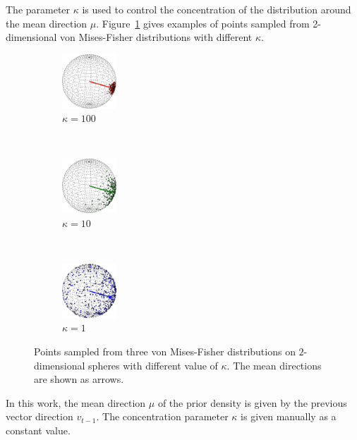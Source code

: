 The parameter $\kappa$ is used to control the concentration of the distribution around the mean direction $\mu$. Figure~\ref{fisher} gives examples of points sampled from 2-dimensional von Mises-Fisher distributions with different $\kappa$.

\begin{figure}[htb]
  \centering
  \begin{subfigure}[b]{0.16\textwidth}
    \centering
    \includegraphics[width=0.8in]{../figures/vf_100.eps}
    \caption{$\kappa=100$}
  \end{subfigure}~
  \begin{subfigure}[b]{0.16\textwidth}
    \centering
    \includegraphics[width=0.8in]{../figures/vf_10.eps}
    \caption{$\kappa=10$}
  \end{subfigure}~
  \begin{subfigure}[b]{0.16\textwidth}
    \centering
    \includegraphics[width=0.8in]{../figures/vf_1.eps}
    \caption{$\kappa=1$}
  \end{subfigure}
  \caption{Points sampled from three von Mises-Fisher distributions on $2$-dimensional spheres with different value of $\kappa$. The mean directions are shown as arrows.}
  \label{fisher}
\end{figure}

In this work, the mean direction $\mu$ of the prior density is given by the previous vector direction ${v_{t - 1}}$. The concentration parameter $\kappa$ is given manually as a constant value.

